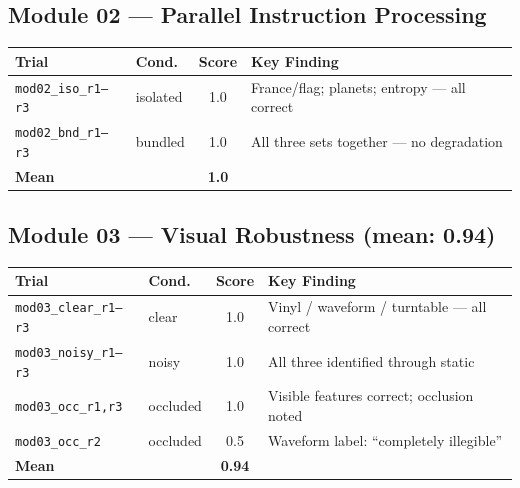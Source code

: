 \documentclass[12pt, a4paper]{article}
\begin{document}
{\small\setlength{\tabcolsep}{4pt}
\subsection*{Module 02 — Parallel Instruction Processing}
\begin{center}
\begin{tabular}{llcl}
\toprule
\rowcolor{AncientUmber!60!VoidBackground}
\textcolor{FireText}{\textbf{Trial}} &
\textcolor{FireText}{\textbf{Cond.}} &
\textcolor{FireText}{\textbf{Score}} &
\textcolor{FireText}{\textbf{Key Finding}} \\
\midrule
\texttt{mod02\_iso\_r1--r3} & isolated & 1.0 & France/flag; planets; entropy — all correct \\
\texttt{mod02\_bnd\_r1--r3} & bundled  & 1.0 & All three sets together — no degradation \\
\midrule
\multicolumn{2}{l}{\textbf{Mean}} & \textbf{1.0} & \\
\bottomrule
\end{tabular}
\end{center}

\subsection*{Module 03 — Visual Robustness (mean: 0.94)}
\begin{center}
\begin{tabular}{llcl}
\toprule
\rowcolor{AncientUmber!60!VoidBackground}
\textcolor{FireText}{\textbf{Trial}} &
\textcolor{FireText}{\textbf{Cond.}} &
\textcolor{FireText}{\textbf{Score}} &
\textcolor{FireText}{\textbf{Key Finding}} \\
\midrule
\texttt{mod03\_clear\_r1--r3}    & clear    & 1.0 & Vinyl / waveform / turntable — all correct \\
\texttt{mod03\_noisy\_r1--r3}    & noisy    & 1.0 & All three identified through static \\
\texttt{mod03\_occ\_r1,r3}       & occluded & 1.0 & Visible features correct; occlusion noted \\
\texttt{mod03\_occ\_r2}          & occluded & \textcolor{CrimsonReceipt}{0.5} & Waveform label: ``completely illegible'' \\
\midrule
\multicolumn{2}{l}{\textbf{Mean}} & \textbf{0.94} & \\
\bottomrule
\end{tabular}
\end{center}

}
\end{document}
